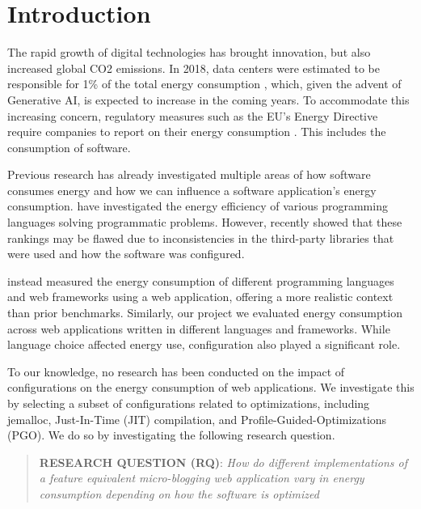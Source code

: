 \documentclass[../main.tex]{subfiles}
\begin{document}
\section{Introduction}
The rapid growth of digital technologies has brought innovation, but also increased global CO2 emissions. In 2018, data centers were estimated to be responsible for 1\% of the total energy consumption \cite{Masanet_Shehabi_Lei_Smith_Koomey_2020}, which, given the advent of Generative AI, is expected to increase in the coming years. To accommodate this increasing concern, regulatory measures such as the EU's Energy Directive require companies to report on their energy consumption \cite{eu-environmental-efficiency-directive, eu-environmental-impact-reporting-article}. This includes the consumption of software.

Previous research has already investigated multiple areas of how software consumes energy and how we can influence a software application's energy consumption. \textcite{pereira2017energy, Pereira_Couto_Ribeiro_Rua_Cunha_Fernandes_Saraiva_2021, Couto_Pereira_Ribeiro_Rua_Saraiva_2017, Gordillo_Calero_Moraga_García_Fernandes_Abreu_Saraiva_2024} have investigated the energy efficiency of various programming languages solving programmatic problems. However, \textcite{Kempen_Kwon_Nguyen_Berger_2024} recently showed that these rankings may be flawed due to inconsistencies in the third-party libraries that were used and how the software was configured.

\textcite{Pfeiffer_Trindade_Meding_Harwick} instead measured the energy consumption of different programming languages and web frameworks using a web application, offering a more realistic context than prior benchmarks. Similarly, our project \cite{Pfeiffer_Offenberg_Pedersen_Landsgaard_Karlsen} we evaluated energy consumption across web applications written in different languages and frameworks. While language choice affected energy use, configuration also played a significant role.

To our knowledge, no research has been conducted on the impact of configurations on the energy consumption of web applications. We investigate this by selecting a subset of configurations related to optimizations, including jemalloc, Just-In-Time (JIT) compilation, and Profile-Guided-Optimizations (PGO). We do so by investigating the following research question.

\begin{quote}
    \textbf{RESEARCH QUESTION (RQ)}: \emph{How do different implementations of a feature equivalent micro-blogging web application vary in energy consumption depending on how the software is optimized}
\end{quote}
\end{document}
